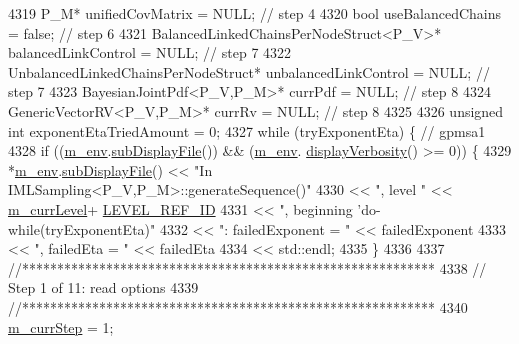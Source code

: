 \begin{DoxyCode}
{4319     P\_M*                                      unifiedCovMatrix      = NULL;  \textcolor{comment}{// step 4}
4320     \textcolor{keywordtype}{bool}                                      useBalancedChains     = \textcolor{keyword}{false}; \textcolor{comment}{// step 6}
4321     BalancedLinkedChainsPerNodeStruct<P\_V>* balancedLinkControl   = NULL;  \textcolor{comment}{// step 7}
4322     UnbalancedLinkedChainsPerNodeStruct*    unbalancedLinkControl = NULL;  \textcolor{comment}{// step 7}
4323     BayesianJointPdf<P\_V,P\_M>*         currPdf               = NULL;  \textcolor{comment}{// step 8}
4324     GenericVectorRV<P\_V,P\_M>*          currRv                = NULL;  \textcolor{comment}{// step 8}
4325 
4326     \textcolor{keywordtype}{unsigned} \textcolor{keywordtype}{int} exponentEtaTriedAmount = 0;
4327     \textcolor{keywordflow}{while} (tryExponentEta) \{ \textcolor{comment}{// gpmsa1}
4328       \textcolor{keywordflow}{if} ((\hyperlink{class_q_u_e_s_o_1_1_m_l_sampling_a13f1ca4fe9f94822fe572a743eaced1d}{m\_env}.\hyperlink{class_q_u_e_s_o_1_1_base_environment_a8a0064746ae8dddfece4229b9ad374d6}{subDisplayFile}()) && (\hyperlink{class_q_u_e_s_o_1_1_m_l_sampling_a13f1ca4fe9f94822fe572a743eaced1d}{m\_env}.
      \hyperlink{class_q_u_e_s_o_1_1_base_environment_a1fe5f244fc0316a0ab3e37463f108b96}{displayVerbosity}() >= 0)) \{
4329         *\hyperlink{class_q_u_e_s_o_1_1_m_l_sampling_a13f1ca4fe9f94822fe572a743eaced1d}{m\_env}.\hyperlink{class_q_u_e_s_o_1_1_base_environment_a8a0064746ae8dddfece4229b9ad374d6}{subDisplayFile}() << \textcolor{stringliteral}{"In IMLSampling<P\_V,P\_M>::generateSequence()"}
4330                                 << \textcolor{stringliteral}{", level "} << \hyperlink{class_q_u_e_s_o_1_1_m_l_sampling_af9416874c856e50f3b35270e801f17e4}{m\_currLevel}+
      \hyperlink{_m_l_sampling_level_options_8h_a68d15eaf394d210effcf584b938206d3}{LEVEL\_REF\_ID}
4331                                 << \textcolor{stringliteral}{", beginning 'do-while(tryExponentEta)"}
4332                                 << \textcolor{stringliteral}{": failedExponent = "} << failedExponent
4333                                 << \textcolor{stringliteral}{", failedEta = "}      << failedEta
4334                                 << std::endl;
4335       \}
4336 
4337     \textcolor{comment}{//***********************************************************}
4338     \textcolor{comment}{// Step 1 of 11: read options}
4339     \textcolor{comment}{//***********************************************************}
4340     \hyperlink{class_q_u_e_s_o_1_1_m_l_sampling_a1b1f8ccb4823bdfa26ec652f0807c63e}{m\_currStep} = 1;
}
\end{DoxyCode}
